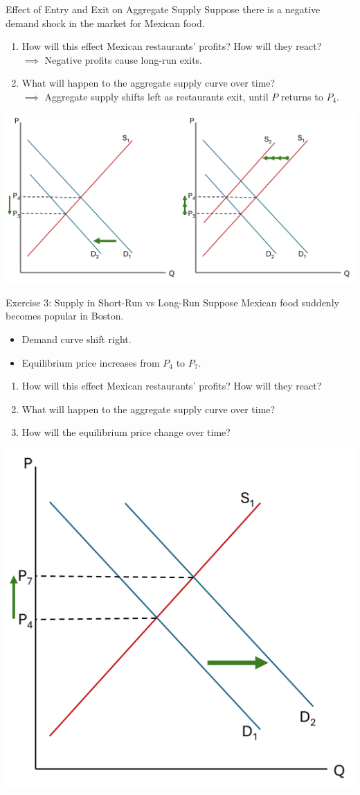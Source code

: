 \documentclass[9pt, handout]{beamer}
\begin{document}
\begin{frame}{Effect of Entry and Exit on Aggregate Supply}
    Suppose there is a negative demand shock in the market for Mexican food.
    \begin{enumerate}
        \item How will this effect Mexican restaurants' profits? How will they react?\\
        $\implies$ Negative profits cause long-run exits.
        \item What will happen to the aggregate supply curve over time?\\
        $\implies$ Aggregate supply shifts left as restaurants exit, until $P$ returns to $P_4$.
    \end{enumerate}
    \includegraphics[width=\linewidth]{supply_falls.png}
\end{frame}

\begin{frame}{Exercise 3: Supply in Short-Run vs Long-Run}
    Suppose Mexican food suddenly becomes popular in Boston.
    \begin{itemize}
        \item Demand curve shift right.
        \item Equilibrium price increases from $P_4$ to $P_7$.
    \end{itemize}
    \begin{enumerate}
        \item How will this effect Mexican restaurants' profits? How will they react?
        \item What will happen to the aggregate supply curve over time?
        \item How will the equilibrium price change over time?
    \end{enumerate}
    \includegraphics[width=.4\linewidth]{demand_increases.png}
\end{frame}
\end{document}
